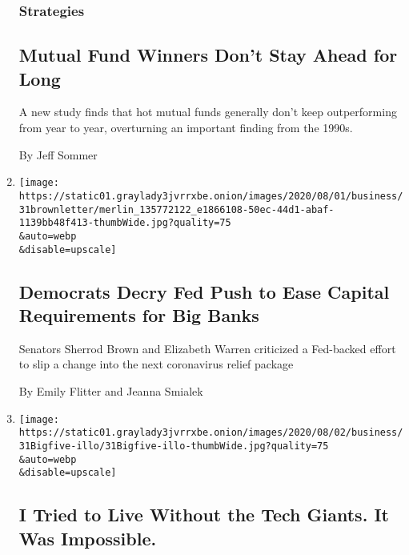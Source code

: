 \begin{enumerate}
  \hypertarget{strategies}{%
  \subsubsection{Strategies}\label{strategies}}

  \hypertarget{mutual-fund-winners-dont-stay-ahead-for-long}{%
  \subsection{Mutual Fund Winners Don't Stay Ahead for
  Long}\label{mutual-fund-winners-dont-stay-ahead-for-long}}

  A new study finds that hot mutual funds generally don't keep
  outperforming from year to year, overturning an important finding from
  the 1990s.

  By Jeff Sommer
\item
  \href{/2020/07/31/business/democrats-fed-banks-capital-requirements.html}{}

  \texttt{[image: https://static01.graylady3jvrrxbe.onion/images/2020/08/01/business/31brownletter/merlin\_135772122\_e1866108-50ec-44d1-abaf-1139bb48f413-thumbWide.jpg?quality=75\\\&auto=webp\\\&disable=upscale]}

  \hypertarget{democrats-decry-fed-push-to-ease-capital-requirements-for-big-banks}{%
  \subsection{Democrats Decry Fed Push to Ease Capital Requirements for
  Big
  Banks}\label{democrats-decry-fed-push-to-ease-capital-requirements-for-big-banks}}

  Senators Sherrod Brown and Elizabeth Warren criticized a Fed-backed
  effort to slip a change into the next coronavirus relief package

  By Emily Flitter and Jeanna Smialek
\item
  \href{/2020/07/31/technology/blocking-the-tech-giants.html}{}

  \texttt{[image: https://static01.graylady3jvrrxbe.onion/images/2020/08/02/business/31Bigfive-illo/31Bigfive-illo-thumbWide.jpg?quality=75\\\&auto=webp\\\&disable=upscale]}

  \hypertarget{i-tried-to-live-without-the-tech-giants-it-was-impossible}{%
  \subsection{I Tried to Live Without the Tech Giants. It Was
  Impossible.}\label{i-tried-to-live-without-the-tech-giants-it-was-impossible}}


\end{enumerate}
